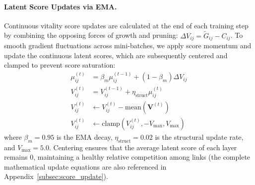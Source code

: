 \documentclass[letterpaper]{article} %
\begin{document}
\paragraph{Latent Score Updates via EMA.} Continuous vitality score updates are calculated at the end of each training step by combining the opposing forces of growth and pruning: $\Delta V_{ij} = \tilde{G}_{ij} - C_{ij}$. To smooth gradient fluctuations across mini-batches, we apply score momentum and update the continuous latent scores, which are subsequently centered and clamped to prevent score saturation:
\begin{align}
    \mu_{ij}^{(t)} &= \beta_m \mu_{ij}^{(t-1)} + (1 - \beta_m) \Delta V_{ij} \\
    V_{ij}^{(t)} &= V_{ij}^{(t-1)} + \eta_{\text{struct}} \mu_{ij}^{(t)} \\
    V_{ij}^{(t)} &\leftarrow V_{ij}^{(t)} - \text{mean}(\bm{V}^{(t)}) \\
    V_{ij}^{(t)} &\leftarrow \text{clamp}(V_{ij}^{(t)}, -V_{\text{max}}, V_{\text{max}})
\end{align}
where $\beta_m = 0.95$ is the EMA decay, $\eta_{\text{struct}} = 0.02$ is the structural update rate, and $V_{\text{max}} = 5.0$. Centering ensures that the average latent score of each layer remains 0, maintaining a healthy relative competition among links (the complete mathematical update equations are also referenced in Appendix~\ref{subsec:score_update}).
\end{document}
